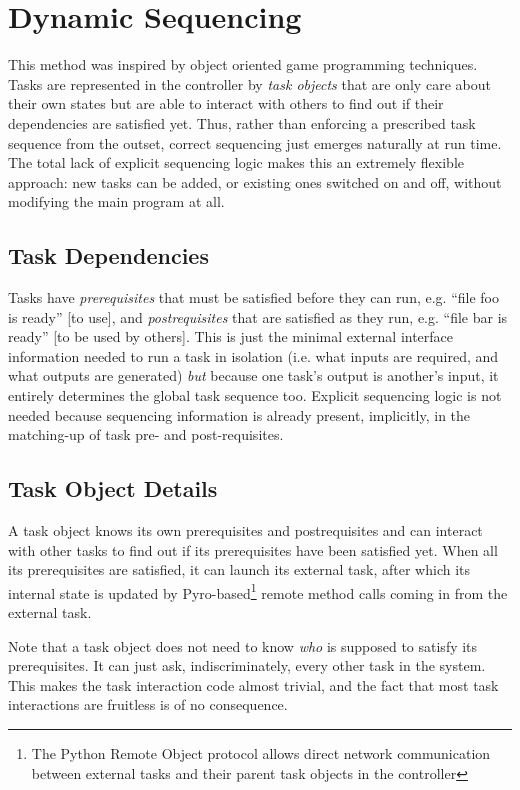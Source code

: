 \documentclass[a4paper,12pt]{amsart}
\begin{document}
\section{Dynamic Sequencing}

This method was inspired by object oriented game programming techniques.
Tasks are represented in the controller by {\em task objects} that are
only care about their own states but are able to interact with others to
find out if their dependencies are satisfied yet. Thus, rather than
enforcing a prescribed task sequence from the outset, correct sequencing
just emerges naturally at run time.  The total lack of explicit
sequencing logic makes this an extremely flexible approach: new tasks
can be added, or existing ones switched on and off, without modifying
the main program at all.


\subsection{Task Dependencies}

Tasks have {\em prerequisites} that must be satisfied before they can
run, e.g. ``file foo is ready'' [to use], and {\em postrequisites} that
are satisfied as they run, e.g. ``file bar is ready'' [to be used by
others]. This is just the minimal external interface information needed
to run a task in isolation (i.e. what inputs are required, and what
outputs are generated) {\em but} because one task's output is another's
input, it entirely determines the global task sequence too. Explicit
sequencing logic is not needed because sequencing information is already
present, implicitly, in the matching-up of task pre- and
post-requisites. 

\subsection{Task Object Details}

A task object knows its own prerequisites and postrequisites and can
interact with other tasks to find out if its prerequisites have been
satisfied yet. When all its prerequisites are satisfied, it can
launch its external task, after which its internal state is updated by
Pyro-based\footnote{The Python Remote Object protocol allows direct
network communication between external tasks and their parent task
objects in the controller} remote method calls coming in from the
external task. 

Note that a task object does not need to know {\em who} is supposed to
satisfy its prerequisites. It can just ask, indiscriminately, every
other task in the system.  This makes the task interaction code almost
trivial, and the fact that most task interactions are fruitless is of no
consequence. 
\end{document}
